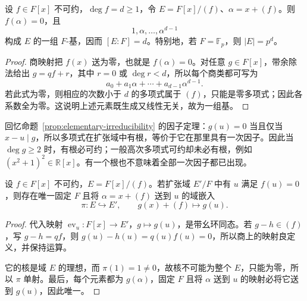 \documentclass[lang=cn,a4paper,fontset=none,zihao=false,10pt,openany,twoside]{beautybook}
\numberwithin{algorithm}{chapter}
\begin{document}
\begin{proposition}[商域中的根与基]\label{prop:adjoin-root}
设 $f\in F[x]$ 不可约，$\deg f=d\ge1$，令 $E=F[x]/(f)$、$\alpha=x+(f)$。则 $f(\alpha)=0$，且
\[
 1,\alpha,\ldots,\alpha^{d-1}
\]
构成 $E$ 的一组 $F$-基，因而 $[E:F]=d$。特别地，若 $F=\mathbb F_p$，则 $|E|=p^d$。
\end{proposition}
\begin{proof}
商映射把 $f(x)$ 送为零，也就是 $f(\alpha)=0$。对任意 $g\in F[x]$，带余除法给出 $g=qf+r$，其中 $r=0$ 或 $\deg r<d$，所以每个商类都可写为
\[
 a_0+a_1\alpha+\cdots+a_{d-1}\alpha^{d-1}.
\]
若此式为零，则相应的次数小于 $d$ 的多项式属于 $(f)$，只能是零多项式；因此各系数全为零。这说明上述元素既生成又线性无关，故为一组基。
\end{proof}
回忆命题~\ref{prop:elementary-irreducibility} 的因子定理：$g(u)=0$ 当且仅当 $x-u\mid g$，所以多项式在扩张域中有根，等价于它在那里具有一次因子。因此当 $\deg g\ge2$ 时，有根必可约；一般高次多项式可约却未必有根，例如 $(x^2+1)^2\in\mathbb R[x]$。有一个根也不意味着全部一次因子都已出现。

\begin{proposition}[根诱导的嵌入]\label{prop:root-embedding}
设 $f\in F[x]$ 不可约，$E=F[x]/(f)$。若扩张域 $E'/F$ 中有 $u$ 满足 $f(u)=0$，则存在唯一固定 $F$ 且将 $\alpha=x+(f)$ 送到 $u$ 的域嵌入
\[
 \pi:E\hookrightarrow E',\qquad g(x)+(f)\longmapsto g(u).
\]
\begin{center}
\end{center}
\end{proposition}
\begin{proof}
代入映射 $\operatorname{ev}_u:F[x]\to E'$，$g\mapsto g(u)$，是带幺环同态。若 $g-h\in(f)$，写 $g-h=qf$，则 $g(u)-h(u)=q(u)f(u)=0$，所以商上的映射良定义，并保持运算。

它的核是域 $E$ 的理想，而 $\pi(1)=1\ne0$，故核不可能为整个 $E$，只能为零，所以 $\pi$ 单射。最后，每个元素都为 $g(\alpha)$，固定 $F$ 且将 $\alpha$ 送到 $u$ 的映射必将它送到 $g(u)$，因此唯一。
\end{proof}
\end{document}
